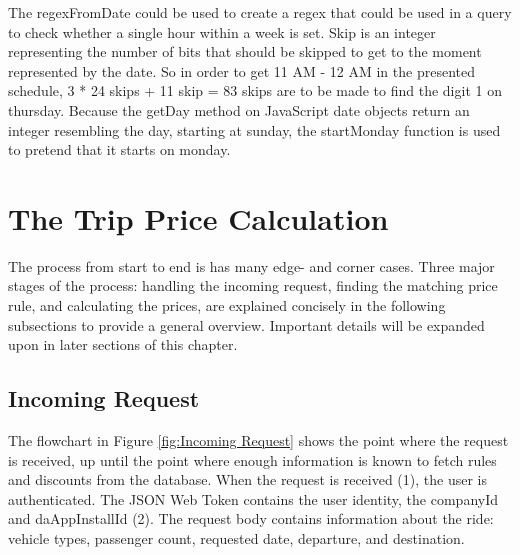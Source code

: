The regexFromDate could be used to create a regex that could be used in a query to check whether a single hour within a week is set. Skip is an integer representing the number of bits that should be skipped to get to the moment represented by the date. So in order to get 11 AM - 12 AM in the presented schedule, 3 * 24 skips + 11 skip = 83 skips are to be made to find the digit 1 on thursday. Because the getDay method on JavaScript date objects return an integer resembling the day, starting at sunday, the startMonday function is used to pretend that it starts on monday.

\section{The Trip Price Calculation}
The process from start to end is has many edge- and corner cases. Three major stages of the process: handling the incoming request, finding the matching price rule, and calculating the prices, are explained concisely in the following subsections to provide a general overview. Important details will be expanded upon in later sections of this chapter.

\subsection{Incoming Request}
The flowchart in Figure \ref{fig:Incoming Request} shows the point where the request is received, up until the point where enough information is known to fetch rules and discounts from the database. When the request is received (1), the user is authenticated. The JSON Web Token contains the user identity, the companyId and daAppInstallId (2). The request body contains information about the ride: vehicle types, passenger count, requested date, departure, and destination.

